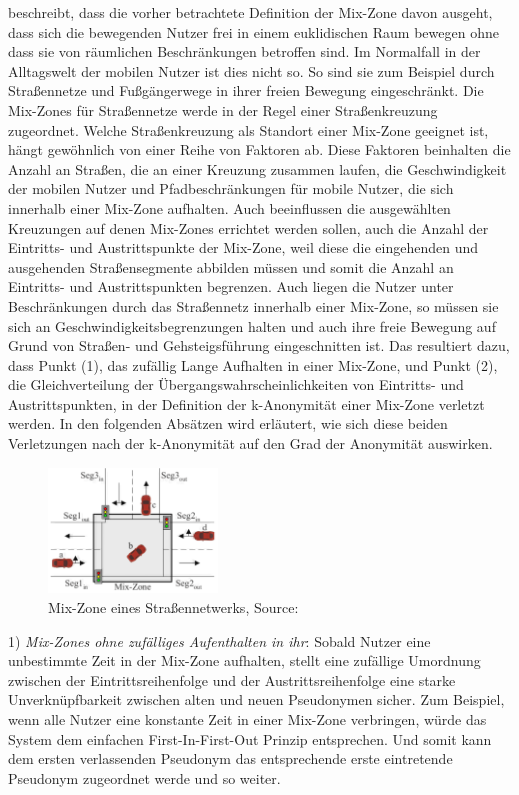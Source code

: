 \cite{Palanisamy2011} beschreibt, dass die vorher betrachtete Definition der Mix-Zone davon ausgeht, dass sich die bewegenden Nutzer frei in einem euklidischen Raum bewegen ohne dass sie von räumlichen Beschränkungen betroffen sind. Im Normalfall in der Alltagswelt der mobilen Nutzer ist dies nicht so. So sind sie zum Beispiel durch Straßennetze und Fußgängerwege in ihrer freien Bewegung eingeschränkt. Die Mix-Zones für Straßennetze werde in der Regel einer Straßenkreuzung zugeordnet. Welche Straßenkreuzung als Standort einer Mix-Zone geeignet ist, hängt gewöhnlich von einer Reihe von Faktoren ab. Diese Faktoren beinhalten die Anzahl an Straßen, die an einer Kreuzung zusammen laufen, die Geschwindigkeit der mobilen Nutzer und Pfadbeschränkungen für mobile Nutzer, die sich innerhalb einer Mix-Zone aufhalten. Auch beeinflussen die ausgewählten Kreuzungen auf denen Mix-Zones errichtet werden sollen, auch die Anzahl der Eintritts- und Austrittspunkte der Mix-Zone, weil diese die eingehenden und ausgehenden Straßensegmente abbilden müssen und somit die Anzahl an Eintritts- und Austrittspunkten begrenzen. Auch liegen die Nutzer unter Beschränkungen durch das Straßennetz innerhalb einer Mix-Zone, so müssen sie sich an Geschwindigkeitsbegrenzungen halten und auch ihre freie Bewegung auf Grund von Straßen- und Gehsteigsführung eingeschnitten ist. Das resultiert dazu, dass Punkt (1), das zufällig Lange Aufhalten in einer Mix-Zone, und Punkt (2), die Gleichverteilung der Übergangswahrscheinlichkeiten  von Eintritts- und Austrittspunkten, in der Definition der k-Anonymität einer Mix-Zone verletzt werden. In den folgenden Absätzen wird erläutert, wie sich diese beiden Verletzungen nach \cite{Chow2011} der k-Anonymität auf den  Grad der Anonymität auswirken.

\begin{figure}[!h]
		\centering
		\includegraphics[width=0.4\textwidth]{Bilder/MixZoneNetwork.PNG}
		\caption{Mix-Zone eines Straßennetwerks, Source: \protect\cite{Chow2011}}
		\label{fig_MixSrasse}
	\end{figure}

1)	\textit{Mix-Zones ohne zufälliges Aufenthalten in ihr}: Sobald Nutzer eine unbestimmte Zeit in der Mix-Zone aufhalten, stellt eine zufällige Umordnung zwischen der Eintrittsreihenfolge und der Austrittsreihenfolge eine starke Unverknüpfbarkeit zwischen alten und neuen Pseudonymen sicher. Zum Beispiel, wenn alle Nutzer eine konstante Zeit in einer Mix-Zone verbringen, würde das System dem einfachen First-In-First-Out Prinzip entsprechen. Und somit kann dem ersten verlassenden Pseudonym das entsprechende erste eintretende Pseudonym zugeordnet werde und so weiter.

